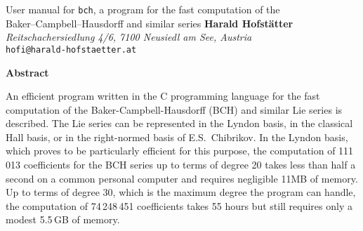 \documentclass[11pt,a4paper]{article}
\begin{document}
\begin{center}
    {\LARGE User manual for {\tt bch}, a program for the fast computation of the\\[2mm]
    Baker--Campbell--Hausdorff and similar series}
\vskip 20pt
{\bf Harald Hofst\"atter}\\ %
{\small\it Reitschachersiedlung 4/6, 7100 Neusiedl am See, Austria}\\
{\tt hofi@harald-hofstaetter.at}\\ %
\end{center}
\vskip 20pt



\centerline{\bf Abstract}
\noindent
An efficient  program written in the C programming language for the fast computation
of the Baker-Campbell-Hausdorff (BCH) and similar Lie series is described.
The Lie series can be represented in the Lyndon basis, in the
classical Hall basis, or in the right-normed basis of 
E.S.~Chibrikov.  In the Lyndon basis,
which proves to be particularly efficient for this purpose,
the computation of 111\,013 coefficients for the BCH series up to terms of degree 20
takes less than half a second on a common personal computer and requires negligible 11MB of memory.
Up to terms of degree 30, which is the maximum degree the program can handle, 
the computation of 74\,248\,451 coefficients takes 55 hours but still requires only a modest 5.5\,GB of  memory.


\vskip 30pt

\end{document}
